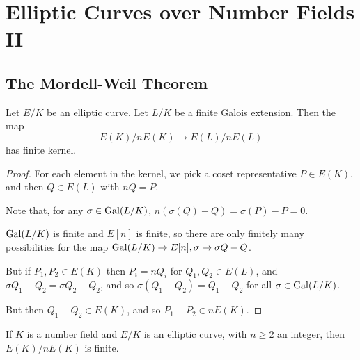 \documentclass[10pt,a4paper]{article}
\begin{document}
\section{Elliptic Curves over Number Fields II}
\subsection{The Mordell-Weil Theorem}
\begin{lemma}
  Let $E/K$ be an elliptic curve. Let $L/K$ be a finite Galois extension. Then the map
  \[E(K)/nE(K) \to E(L)/nE(L)\]
  has finite kernel.
\end{lemma}
\begin{proof}
  For each element in the kernel, we pick a coset representative $P \in E(K)$, and then $Q \in E(L)$ with $nQ = P$.

  Note that, for any $\sigma \in \operatorname{Gal}(L/K)$, $n(\sigma(Q) - Q) = \sigma(P)-P = 0$.

  $\operatorname{Gal}(L/K)$ is finite and $E[n]$ is finite, so there are only finitely many possibilities for the map $\operatorname{Gal}(L/K) \to E[n], \sigma \mapsto \sigma Q-Q$.

  But if $P_1, P_2 \in E(K)$ then $P_i = nQ_i$ for $Q_1, Q_2 \in E(L)$, and $\sigma Q_1 -Q_2 = \sigma Q_2 - Q_2$, and so $\sigma(Q_1-Q_2) = Q_1-Q_2$ for all $\sigma \in \operatorname{Gal}(L/K)$.

  But then $Q_1 - Q_2 \in E(K)$, and so $P_1 -P_2 \in n E(K)$.
\end{proof}
\begin{theorem}
  If $K$ is a number field and $E/K$ is an elliptic curve, with $n \geq 2$ an integer, then $E(K)/nE(K)$ is finite.
\end{theorem}
\end{document}
